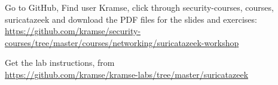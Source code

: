 \documentclass[Screen16to9,17pt]{foils}
\begin{document}

 \begin{list2}
 \item Go to GitHub, Find user Kramse, click through security-courses, courses, suricatazeek and download the PDF files for the slides and exercises:\\  {\footnotesize \url{https://github.com/kramse/security-courses/tree/master/courses/networking/suricatazeek-workshop}}

 \item Get the lab instructions, from\\ {\footnotesize\url{https://github.com/kramse/kramse-labs/tree/master/suricatazeek}}
 \end{list2}





\myquestionspage
\end{document}
